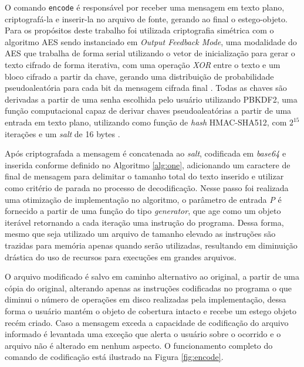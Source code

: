 O comando \texttt{encode} é responsável por receber uma mensagem em texto plano, criptografá-la e inserir-la no arquivo de fonte, gerando ao final o estego-objeto. Para os propósitos deste trabalho foi utilizada criptografia simétrica com o algoritmo AES sendo instanciado em \textit{Output Feedback Mode}, uma modalidade do AES que trabalha de forma serial utilizando o vetor de inicialização para gerar o texto cifrado de forma iterativa, com uma operação \textit{XOR} entre o texto e um bloco cifrado a partir da chave, gerando uma distribuição de probabilidade pseudoaleatória para cada bit da mensagem cifrada final \cite{Dworkin2001}. Todas as chaves são derivadas a partir de uma senha escolhida pelo usuário utilizando PBKDF2, uma função computacional capaz de derivar chaves pseudoaleatórias a partir de uma entrada em texto plano, utilizando como função de \textit{hash} HMAC-SHA512, com $2^{15}$ iterações e um \textit{salt} de 16 bytes \cite{Turan2010}.

Após criptografada a mensagem é concatenada ao \textit{salt}, codificada em \textit{base64}  e inserida conforme definido no Algoritmo \ref{alg:one}, adicionando um caractere de final de mensagem para delimitar o tamanho total do texto inserido e utilizar como critério de parada no processo de decodificação. Nesse passo foi realizada uma otimização de implementação no algoritmo, o parâmetro de entrada \textit{P} é fornecido a partir de uma função do tipo \textit{generator}, que age como um objeto iterável retornando a cada iteração uma instrução do programa. Dessa forma, mesmo que seja utilizado um arquivo de tamanho elevado as instruções são trazidas para memória apenas quando serão utilizadas, resultando em diminuição drástica do uso de recursos para execuções em grandes arquivos.

O arquivo modificado é salvo em caminho alternativo ao original, a partir de uma cópia do original, alterando apenas as instruções codificadas no programa o que diminui o número de operações em disco realizadas pela implementação, dessa forma o usuário mantém o objeto de cobertura intacto e recebe um estego objeto recém criado. Caso a mensagem exceda a capacidade de codificação do arquivo informado é levantada uma exceção que alerta o usuário sobre o ocorrido e o arquivo não é alterado em nenhum aspecto. O funcionamento completo do comando de codificação está ilustrado na Figura \ref{fig:encode}.

